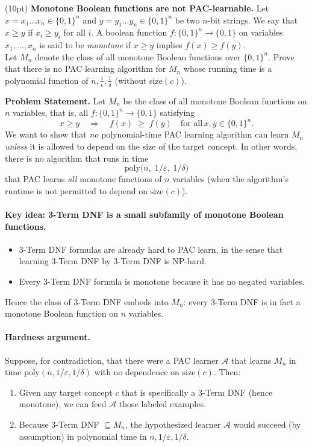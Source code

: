 \documentclass[11pt]{article}
\DeclareMathOperator{\1}{\mathbbm{1}}
\begin{document}
\begin{problem} (10pt) \textbf{Monotone Boolean functions are not PAC-learnable.} Let $x = x_1\dots x_n \in \{0,1\}^n$ and $y = y_1\dots y_n \in
\{0,1\}^n$ be two $n$-bit strings.  We say that $x \geq y$ if $x_i \geq y_i$ for
all $i.$ A boolean function $f: \{0,1\}^n \rightarrow \{0,1\}$ on variables
$x_1,\dots,x_n$ is said to be {\em monotone} if $x \geq y$ implies $f(x) \geq
f(y).$\\ Let $M_n$ denote the class of all monotone Boolean functions over
$\{0,1\}^n.$  Prove that there is no PAC learning algorithm for $M_n$ whose
running time is a polynomial function of $n, \frac{1}{\epsilon}, \frac{1}{\delta}$ (without
size$(c)$).
\end{problem}

\noindent
\textbf{Problem Statement.}
Let $M_n$ be the class of all monotone Boolean functions on $n$ variables, that is, all $f:\{0,1\}^n \to \{0,1\}$ satisfying
\[
x \ge y \quad\Longrightarrow\quad f(x)\;\ge\;f(y)\quad \text{for all}\,x,y\in\{0,1\}^n.
\]
We want to show that \emph{no} polynomial-time PAC learning algorithm can learn $M_n$ \emph{unless} it is allowed to depend on the size of the target concept.  In other words, there is no algorithm that runs in time
\[
\text{poly}\bigl(n,\;1/\varepsilon,\;1/\delta\bigr)
\]
that PAC learns \emph{all} monotone functions of $n$ variables (when the algorithm’s runtime is not permitted to depend on $\text{size}(c)$).

\paragraph{Key idea: 3-Term DNF is a small subfamily of monotone Boolean functions.}
\begin{itemize}
	\item 3-Term DNF formulas are already hard to PAC learn, in the sense that learning 3-Term DNF by 3-Term DNF is NP-hard.
	\item Every 3-Term DNF formula is monotone because it has no negated variables.
\end{itemize}

Hence the class of 3-Term DNF embeds into $M_n$:  every 3-Term DNF is in fact a monotone Boolean function on $n$ variables.

\paragraph{Hardness argument.}
Suppose, for contradiction, that there were a PAC learner $\mathcal{A}$ that learns $M_n$ in time $\text{poly}(n,1/\varepsilon,1/\delta)$ with no dependence on $\text{size}(c)$.  Then:
\begin{enumerate}
	\item Given any target concept $c$ that is specifically a 3-Term DNF (hence monotone), we can feed $\mathcal{A}$ those labeled examples.
	\item Because $3$-Term DNF $\subseteq M_n$, the hypothesized learner $\mathcal{A}$ would succeed (by assumption) in polynomial time in $n,1/\varepsilon,1/\delta$.
\end{enumerate}
\end{document}
